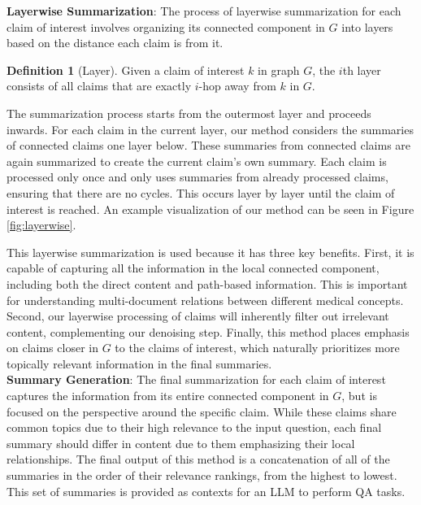 \documentclass[11pt]{article}
\theoremstyle{definition}
\newtheorem{definition}{Definition}
\begin{document}
\noindent
\textbf{Layerwise Summarization}\label{sec:layerwiseSum}: The process of layerwise summarization for each claim of interest involves organizing its connected component in $G$ into layers based on the distance each claim is from it.

\begin{definition}[Layer]
    Given a claim of interest $k$ in graph $G$, the $i$th layer consists of all claims that are exactly $i$-hop away from $k$ in $G$.
\end{definition}

The summarization process starts from the outermost layer and proceeds inwards. For each claim in the current layer, our method considers the summaries of connected claims one layer below. These summaries from connected claims are again summarized to create the current claim's own summary. Each claim is processed only once and only uses summaries from already processed claims, ensuring that there are no cycles. This occurs layer by layer until the claim of interest is reached. An example visualization of our method can be seen in Figure \ref{fig:layerwise}. 

This layerwise summarization is used because it has three key benefits. First, it is capable of capturing all the information in the local connected component, including both the direct content and path-based information. This is important for understanding multi-document relations between different medical concepts. Second, our layerwise processing of claims will inherently filter out irrelevant content, complementing our denoising step. Finally, this method places emphasis on claims closer in $G$ to the claims of interest, which naturally prioritizes more topically relevant information in the final summaries. \\



\noindent
\textbf{Summary Generation}\label{sec:summaryGeneration}: The final summarization for each claim of interest captures the information from its entire connected component in $G$, but is focused on the perspective around the specific claim. While these claims share common topics due to their high relevance to the input question, each final summary should differ in content due to them emphasizing their local relationships. The final output of this method is a concatenation of all of the summaries in the order of their relevance rankings, from the highest to lowest. This set of summaries is provided as contexts for an LLM to perform QA tasks.
\end{document}
